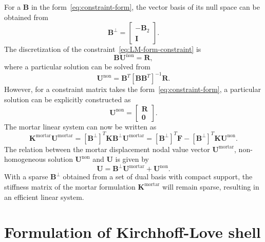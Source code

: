 For a $\mathbf{B}$ in the form~\eqref{eq:constraint-form}, the vector basis of its null space can be obtained from
\begin{equation}
	\mathbf{B}^\perp=\begin{bmatrix}
		-\mathbf{B}_2 \\
		\mathbf{I}
	\end{bmatrix}.
	\label{eq:null-space}
\end{equation}
The discretization of the constraint~\eqref{eq:LM-form-constraint} is
\begin{equation}
	\mathbf{B}\mathbf{U}^\text{non} = \mathbf{R},
\end{equation}
where a particular solution can be solved from~\cite{ainsworth2001essential}
\begin{equation}
	\mathbf{U}^\text{non} = \mathbf{B}^T\left[ \mathbf{B}\mathbf{B}^T \right]^{-1}\mathbf{R}.
\end{equation}
However, for a constraint matrix takes the form~\eqref{eq:constraint-form}, a particular solution can be explicitly constructed as
\begin{equation}
	\mathbf{U}^\text{non} = \begin{bmatrix}
		\mathbf{R} \\\mathbf{0}
	\end{bmatrix}.\label{eq:dual_particular_solution}
\end{equation}
The mortar linear system can now be written as
\begin{equation}
	\mathbf{K}^{\text{mortar}}\mathbf{U}^{\text{mortar}}=\left[\mathbf{B}^\perp\right]^T\mathbf{K}\mathbf{B}^\perp\mathbf{U}^{\text{mortar}}=\left[\mathbf{B}^\perp\right]^T\mathbf{F}-\left[\mathbf{B}^\perp\right]^T\mathbf{K}\mathbf{U}^\text{non}.\label{eq:mortar-form-discretized}
\end{equation}
The relation between the mortar displacement nodal value vector $\mathbf{U}^{\text{mortar}}$, non-homogeneous solution $\mathbf{U}^\text{non}$ and $\mathbf{U}$ is given by
\begin{equation}
	\mathbf{U}=\mathbf{B}^\perp\mathbf{U}^{\text{mortar}}+\mathbf{U}^\text{non}.
\end{equation}
With a sparse $\mathbf{B}^\perp$ obtained from a set of dual basis with compact support, the stiffness matrix of the mortar formulation $\mathbf{K}^{\text{mortar}}$ will remain sparse, resulting in an efficient linear system.

\section{Formulation of Kirchhoff-Love shell}\label{sec:formulation}

